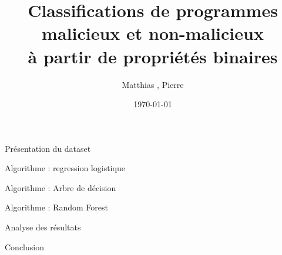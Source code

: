 \documentclass[9.5pt]{beamer}
\title[Détection de virus informatique]{Classifications de programmes malicieux et non-malicieux\\ à partir de propriétés binaires}
\author{Matthias \bsc{Beaupère}, Pierre \bsc{Granger}}
\institute{M2 CHPS}
\date{\today}
\begin{document}

\begin{frame}
  \titlepage
\end{frame}



\begin{frame}{Présentation du dataset}
\end{frame}

\begin{frame}{Algorithme : regression logistique}
\end{frame}

\begin{frame}{Algorithme : Arbre de décision}
\end{frame}

\begin{frame}{Algorithme : Random Forest}
\end{frame}

\begin{frame}{Analyse des résultats}
\end{frame}

\begin{frame}{Conclusion}
\end{frame}
\end{document}
